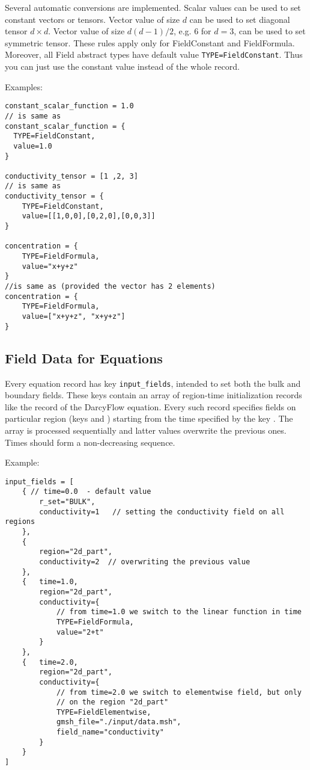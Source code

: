 Several automatic conversions are implemented. Scalar values can be used to set constant vectors or tensors. Vector value of size $d$ can be used to set diagonal tensor $d\times d$.
Vector value of size $d(d-1)/2$, e.g. $6$ for $d=3$, can be used to set symmetric tensor. These rules apply only for FieldConstant and FieldFormula.
Moreover, all Field abstract types have default value \verb'TYPE=FieldConstant'. Thus you can just use the constant value instead of the whole record.

Examples:
\begin{verbatim}
constant_scalar_function = 1.0
// is same as
constant_scalar_function = {
  TYPE=FieldConstant,
  value=1.0
}

conductivity_tensor = [1 ,2, 3]
// is same as
conductivity_tensor = {
    TYPE=FieldConstant,
    value=[[1,0,0],[0,2,0],[0,0,3]]
}

concentration = {
    TYPE=FieldFormula,
    value="x+y+z"
}
//is same as (provided the vector has 2 elements)
concentration = {
    TYPE=FieldFormula,
    value=["x+y+z", "x+y+z"]
}       
\end{verbatim}

\subsection{Field Data for Equations}
Every equation record has key \verb'input_fields', intended to set both the bulk and boundary fields. These keys contain an array of region-time initialization records
like the  record of the DarcyFlow equation. Every such record specifies fields on particular region 
(keys  and  ) starting from the time specified by the key .
The array is processed sequentially and latter values overwrite the previous ones. Times should form a non-decreasing sequence.

Example:
\begin{verbatim}
input_fields = [   
    { // time=0.0  - default value
        r_set="BULK",
        conductivity=1   // setting the conductivity field on all regions
    },
    {
        region="2d_part",
        conductivity=2  // overwriting the previous value
    },
    {   time=1.0,
        region="2d_part",
        conductivity={
            // from time=1.0 we switch to the linear function in time
            TYPE=FieldFormula,
            value="2+t"      
        }    
    },
    {   time=2.0,
        region="2d_part",
        conductivity={
            // from time=2.0 we switch to elementwise field, but only
            // on the region "2d_part"
            TYPE=FieldElementwise,
            gmsh_file="./input/data.msh",
            field_name="conductivity"
        }
    }    
]               
\end{verbatim}

